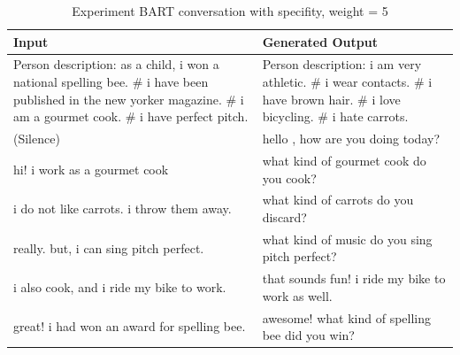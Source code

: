 \begin{table}[ht]
\centering
 \begin{tabular}{|p{7cm}|p{7cm}|} 
 \hline\hline
 \textbf{Input} & \textbf{Generated Output} \\
 \hline\hline
 Person description: as a child, i won a national spelling bee. \# i have been published in the new yorker magazine. \# i am a gourmet cook. \# i have perfect pitch. & Person description: i am very athletic. \# i wear contacts. \# i have brown hair. \# i love bicycling. \# i hate carrots. \\
 \hline
 (Silence) & hello , how are you doing today?\\ 
 \hline
 hi! i work as a gourmet cook & what kind of gourmet cook do you cook?\\
 \hline
 i do not like carrots. i throw them away. & what kind of carrots do you discard? \\
 \hline 
 really. but, i can sing pitch perfect. & what kind of music do you sing pitch perfect? \\
 \hline
 i also cook, and i ride my bike to work. & that sounds fun! i ride my bike to work as well. \\
 \hline 
 great! i had won an award for spelling bee. & awesome! what kind of spelling bee did you win? \\
 \hline\hline
 \end{tabular}
 \caption{Experiment BART conversation with specifity, weight = 5}
\label{tab:bart_conversation_idf5}
\end{table}

